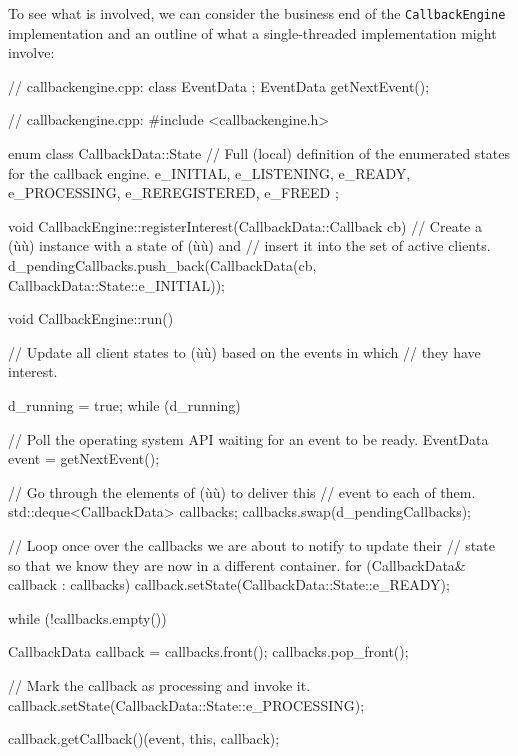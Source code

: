 To see what is involved, we can consider the business end of the
\lstinline!CallbackEngine! implementation and an outline of what a
single-threaded implementation might involve:

\begin{emcppshiddenlisting}[emcppsbatch=e6]
// callbackengine.cpp:
class EventData
{
};
EventData getNextEvent();
\end{emcppshiddenlisting}
\begin{emcppslisting}[emcppsbatch=e6]
// callbackengine.cpp:
#include <callbackengine.h>

enum class CallbackData::State
{
    // Full (local) definition of the enumerated states for the callback engine.
    e_INITIAL,
    e_LISTENING,
    e_READY,
    e_PROCESSING,
    e_REREGISTERED,
    e_FREED
};

void CallbackEngine::registerInterest(CallbackData::Callback cb)
{
    // Create a (ù{}ù) instance with a state of (ù{}ù) and
    // insert it into the set of active clients.
    d_pendingCallbacks.push_back(CallbackData(cb, CallbackData::State::e_INITIAL));
}

void CallbackEngine::run()
{
    // Update all client states to (ù{}ù) based on the events in which
    // they have interest.

    d_running = true;
    while (d_running)
    {
        // Poll the operating system API waiting for an event to be ready.
        EventData event = getNextEvent();

        // Go through the elements of (ù{}ù) to deliver this
        // event to each of them.
        std::deque<CallbackData> callbacks;
        callbacks.swap(d_pendingCallbacks);

        // Loop once over the callbacks we are about to notify to update their
        // state so that we know they are now in a different container.
        for (CallbackData& callback : callbacks)
        {
            callback.setState(CallbackData::State::e_READY);
        }

        while (!callbacks.empty())
        {
            CallbackData callback = callbacks.front();
            callbacks.pop_front();

            // Mark the callback as processing and invoke it.
            callback.setState(CallbackData::State::e_PROCESSING);

            callback.getCallback()(event, this, callback);

}}}
\end{emcppslisting}

